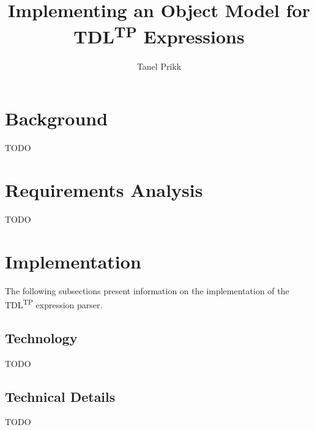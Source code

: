 \documentclass[12pt,oneside,a4paper,notitlepage]{report}
\title{
	Implementing an Object Model for TDL\textsuperscript{TP} Expressions
}
\author{Tanel Prikk}
\begin{document}
	\maketitle

	\section*{Background}
	\par TODO

	\section*{Requirements Analysis}
	\par TODO

	\section*{Implementation}
	\par The following subsections present information on the implementation of the TDL\textsuperscript{TP} expression parser.

	\subsection*{Technology}
	\par TODO

	\subsection*{Technical Details}
	\par TODO

	\printbibliography[
		title=Sources
	]
\end{document}
